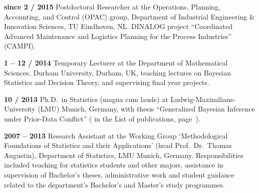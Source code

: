 \documentclass[a4paper]{simplecv}
\begin{document}
\begin{topic}
\item[\hspace*{-2ex}\bfseries since 2 / 2015] Postdoctoral Researcher
                  at the Operations, Planning, Accounting, and Control (OPAC) group,
                  Department of Industrial Engineering \& Innovation Sciences,
                  TU Eindhoven, NL.
DINALOG project ``Coordinated Advanced Maintenance and Logistics Planning for the Process Industries'' (CAMPI).

\item[\hspace*{-2ex}\bfseries 1 -- 12 / 2014]Temporary Lecturer
                  at the Department of Mathematical Sciences,
                  Durham University, Durham, UK,
                  teaching lectures on Bayesian Statistics and Decision Theory,
                  and supervising final year projects. 


\item[\hspace*{-2ex}\bfseries 10 / 2013] Ph.D.\ in Statistics (magna cum laude) at
                  Lud\-wig-Maximi\-li\-ans-Uni\-ver\-si\-ty (LMU) Munich, Germany,
                  with thesis ``Generalized Bayesian Inference under Prior-Data Conflict''
                  (\cite{diss} in the List of publications, page~\pageref{publications}).


\item[\hspace*{-2ex}\bfseries 2007 -- 2013] Research Assistant at the Working Group `Methodological Foundations of Statistics and their Applications'
                    (head Prof.\ Dr.\ Thomas Augustin),
                    Department of Statistics, LMU Munich, Germany.
                    Responsibilities included teaching for statistics students and other majors, %
                    assistance in supervision of Bachelor's theses,
                    administrative work and student guidance related to the department's Bachelor's and Master's study programmes.


\end{topic}
\end{document}
